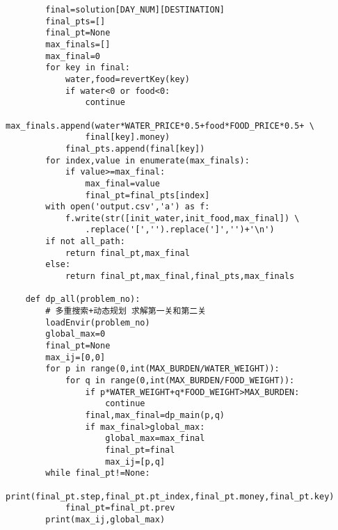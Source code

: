 \documentclass[bwprint]{cumcmthesis} %
\begin{document}
\begin{appendices}
\begin{lstlisting}
        final=solution[DAY_NUM][DESTINATION]
        final_pts=[]
        final_pt=None
        max_finals=[]
        max_final=0
        for key in final:
            water,food=revertKey(key)
            if water<0 or food<0:
                continue
            max_finals.append(water*WATER_PRICE*0.5+food*FOOD_PRICE*0.5+ \
                final[key].money)
            final_pts.append(final[key])
        for index,value in enumerate(max_finals):
            if value>=max_final:
                max_final=value
                final_pt=final_pts[index]
        with open('output.csv','a') as f:
            f.write(str([init_water,init_food,max_final]) \
                .replace('[','').replace(']','')+'\n')
        if not all_path:
            return final_pt,max_final
        else:
            return final_pt,max_final,final_pts,max_finals
    
    def dp_all(problem_no):
        # 多重搜索+动态规划 求解第一关和第二关
        loadEnvir(problem_no)
        global_max=0
        final_pt=None
        max_ij=[0,0]
        for p in range(0,int(MAX_BURDEN/WATER_WEIGHT)):
            for q in range(0,int(MAX_BURDEN/FOOD_WEIGHT)):
                if p*WATER_WEIGHT+q*FOOD_WEIGHT>MAX_BURDEN:
                    continue
                final,max_final=dp_main(p,q)
                if max_final>global_max:
                    global_max=max_final
                    final_pt=final
                    max_ij=[p,q]
        while final_pt!=None:
            print(final_pt.step,final_pt.pt_index,final_pt.money,final_pt.key)
            final_pt=final_pt.prev
        print(max_ij,global_max)
    

\end{lstlisting}
\end{appendices}
\end{document}
